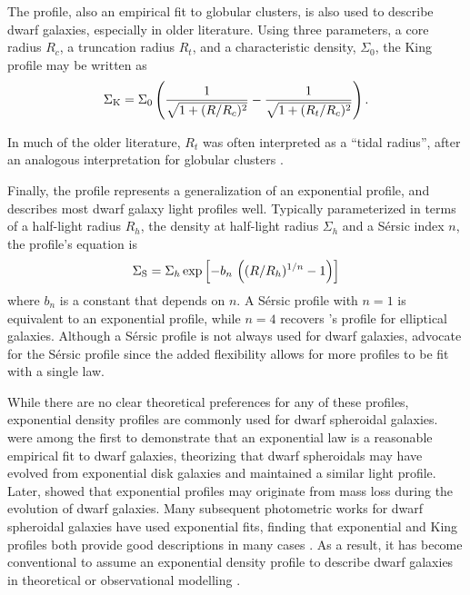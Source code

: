The \citet{king1962} profile, also an empirical fit to globular
clusters, is also used to describe dwarf galaxies, especially in older
literature. Using three parameters, a core radius \(R_c\), a truncation
radius \(R_t\), and a characteristic density, \(\Sigma_0\), the King
profile may be written as \begin{equation}{
\Sigma_{\rm K} = \Sigma_0\left(\frac{1}{\sqrt{1 + (R/R_c)^2}} - \frac{1}{\sqrt{1+(R_t/R_c)^2}}\right).
}\end{equation}

In much of the older literature, \(R_t\) was often interpreted as a
``tidal radius'', after an analogous interpretation for globular
clusters \citep[e.g.,][\citet{hodge1961}]{IH1995}.

Finally, the \citet{sersic1963} profile represents a generalization of
an exponential profile, and describes most dwarf galaxy light profiles
well. Typically parameterized in terms of a half-light radius \(R_h\),
the density at half-light radius \(\Sigma_h\) and a Sérsic index \(n\),
the profile's equation is \begin{equation}{
\Sigma_{\rm S} = \Sigma_h \exp\left[-b_n \,  \left((R/R_h)^{1/n} - 1\right)\right]
}\end{equation} where \(b_n\) is a constant that depends on \(n\). A
Sérsic profile with \(n=1\) is equivalent to an exponential profile,
while \(n=4\) recovers \citet{devaucouleurs1948}'s profile for
elliptical galaxies. Although a Sérsic profile is not always used for
dwarf galaxies, \citet{munoz+2018} advocate for the Sérsic profile since
the added flexibility allows for more profiles to be fit with a single
law.

While there are no clear theoretical preferences for any of these
profiles, exponential density profiles are commonly used for dwarf
spheroidal galaxies. \citet{faber+lin1983} were among the first to
demonstrate that an exponential law is a reasonable empirical fit to
dwarf galaxies, theorizing that dwarf spheroidals may have evolved from
exponential disk galaxies and maintained a similar light profile. Later,
\citet{read+gilmore2005} showed that exponential profiles may originate
from mass loss during the evolution of dwarf galaxies. Many subsequent
photometric works for dwarf spheroidal galaxies have used exponential
fits, finding that exponential and King profiles both provide good
descriptions in many cases
\citetext{\citealp[\citet{mateo1998}]{binggeli+sandage+tarenghi1984}; \citealp{mcconnachie+irwin2006}; \citealp{cicuendez+2018}}.
As a result, it has become conventional to assume an exponential density
profile to describe dwarf galaxies in theoretical or observational
modelling \citetext{\citealp[e.g.,][
\citet{MV2020a}]{martin+2016}; \citealp{battaglia+2022}; \citealp[ but
is for disk]{kowalczyk+2013}}.

